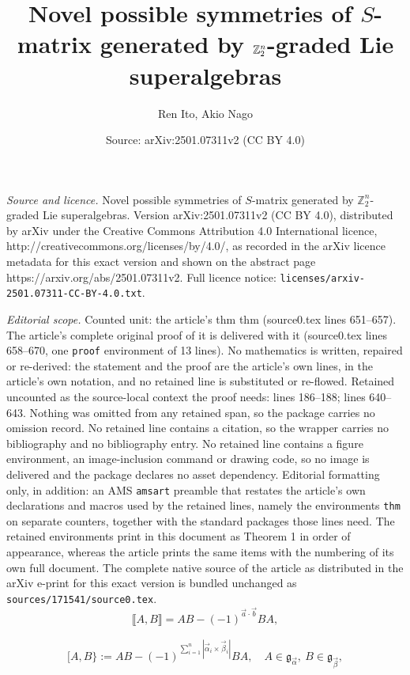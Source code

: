 \documentclass[10pt,a4paper]{amsart}
\title{Novel possible symmetries of $S$-matrix generated by $\Z_2^n$-graded Lie superalgebras}
\author{Ren Ito, Akio Nago}
\date{Source: arXiv:2501.07311v2 (CC BY 4.0)}
\def\Z{\mathbb{Z}}
\def\g{\mathfrak{g}}
\def\ua{\alpha}
\def\ub{\beta}
\begin{document}
\maketitle

\noindent\emph{Source and licence.} Novel possible symmetries of $S$-matrix generated by $\Z_2^n$-graded Lie superalgebras. Version arXiv:2501.07311v2 (CC BY 4.0), distributed by arXiv under the Creative Commons Attribution 4.0 International licence, http://creativecommons.org/licenses/by/4.0/, as recorded in the arXiv licence metadata for this exact version and shown on the abstract page https://arxiv.org/abs/2501.07311v2. Full licence notice: \texttt{licenses/arxiv-2501.07311-CC-BY-4.0.txt}.\par\smallskip

\noindent\textit{Editorial scope.} Counted unit: the article's thm thm (source0.tex lines 651--657). The article's complete original proof of it is delivered with it (source0.tex lines 658--670, one \texttt{proof} environment of 13 lines). No mathematics is written, repaired or re-derived: the statement and the proof are the article's own lines, in the article's own notation, and no retained line is substituted or re-flowed.  Retained uncounted as the source-local context the proof needs: lines 186--188; lines 640--643.  Nothing was omitted from any retained span, so the package carries no omission record.  No retained line contains a citation, so the wrapper carries no bibliography and no bibliography entry.  No retained line contains a figure environment, an image-inclusion command or drawing code, so no image is delivered and the package declares no asset dependency.  Editorial formatting only, in addition: an AMS \texttt{amsart} preamble that restates the article's own declarations and macros used by the retained lines, namely the environments \texttt{thm} on separate counters, together with the standard packages those lines need.  The retained environments print in this document as Theorem 1 in order of appearance, whereas the article prints the same items with the numbering of its own full document.  The complete native source of the article as distributed in the arXiv e-print for this exact version is bundled unchanged as \texttt{sources/171541/source0.tex}.
\begin{equation}
	\llbracket A, B \rrbracket = AB - (-1)^{\vec{a}\cdot\vec{b}} BA, \label{Z2n-LB}
\end{equation}

\begin{align}
 [A,B\}:=AB-(-1)^{\sum_{i=1}^n |\vec{\ua}_i\times \vec{\ub}_i|}BA,\quad A\in \g_{\vec{\ua}},\  B\in \g_{\vec{\ub}}
,\label{Z2n-LieB}
\end{align}
\end{document}
